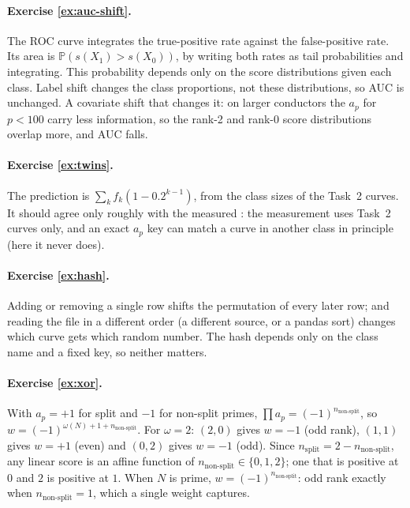 \documentclass[11pt]{article}
\theoremstyle{definition}
\theoremstyle{plain}
\theoremstyle{remark}
\renewcommand{\P}{\mathbb{P}}
\renewcommand{\_}{\oldunderscore\allowbreak}
\begin{document}
\paragraph{Exercise \ref{ex:auc-shift}.}
The ROC curve integrates the true-positive rate against the false-positive rate. Its area is
$\P(s(X_1)>s(X_0))$, by writing both rates as tail probabilities and integrating. This
probability depends only on the score distributions given each class. Label shift changes the
class proportions, not these distributions, so AUC is unchanged. A covariate shift that
changes it: on larger conductors the $a_p$ for $p<100$ carry less information, so the
rank-2 and rank-0 score distributions overlap more, and AUC falls.

\paragraph{Exercise \ref{ex:twins}.}
The prediction is $\sum_kf_k(1-0.2^{k-1})$, from the class sizes of the Task~2 curves. It
should agree only roughly with the measured \CurveSplitMatch: the measurement uses Task~2
curves only, and an exact $a_p$ key can match a curve in another class in principle (here it
never does).

\paragraph{Exercise \ref{ex:hash}.}
Adding or removing a single row shifts the permutation of every later row; and reading the
file in a different order (a different source, or a pandas sort) changes which curve gets
which random number. The hash depends only on the class name and a fixed key, so neither
matters.

\paragraph{Exercise \ref{ex:xor}.}
With $a_p=+1$ for split and $-1$ for non-split primes, $\prod a_p=(-1)^{n_{\text{non-split}}}$, so
$w=(-1)^{\omega(N)+1+n_{\text{non-split}}}$. For $\omega=2$: $(2,0)$ gives $w=-1$ (odd rank),
$(1,1)$ gives $w=+1$ (even) and $(0,2)$ gives $w=-1$ (odd). Since
$n_{\text{split}}=2-n_{\text{non-split}}$, any linear score is an affine function of
$n_{\text{non-split}}\in\{0,1,2\}$; one that is positive at $0$ and $2$ is positive at $1$. When
$N$ is prime, $w=(-1)^{n_{\text{non-split}}}$: odd rank exactly when $n_{\text{non-split}}=1$,
which a single weight captures.
\end{document}

